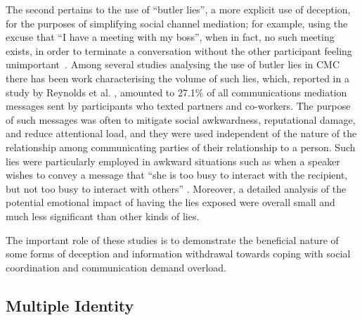 \documentclass{IOS-Book-Article}     %
\newcommand{\tbox}[3][red]{{
\color{#1}\noindent{
   \fbox{\scriptsize{ {\bf #2} \textsl{#3}}}
   \vspace{2pt}
}
}}
\newcommand{\todo}[1]{\tbox{TODO:}{#1}}
\begin{document}
The second pertains to the use of ``butler lies'', a more explicit use of
deception, for the purposes of simplifying social channel mediation; for
example, using the excuse that ``I have a meeting with my boss'', when in fact, no
such meeting exists, in order to terminate a conversation without the other
participant feeling unimportant~\cite{Hancock:2009:BLA:1518701.1518782}.  Among several studies analysing the
use of butler lies in CMC there has been work characterising the volume of such lies,
which, reported in a study by Reynolds et al.
\cite{Reynolds:2013:BLB:2441776.2441862}, amounted to 27.1\% of all
communications mediation messages sent by participants who texted partners and
co-workers. The purpose of such messages was often to mitigate social
awkwardness, reputational damage, and reduce attentional load, and they were used
independent of the nature of the relationship among communicating parties of
their relationship to a person.  Such lies were particularly employed in awkward
situations such as when a speaker wishes to convey a message that ``she is too
busy to interact with the recipient, but not too busy to interact with others''
\cite{Reynolds:2013:BLB:2441776.2441862}.  Moreover, a detailed analysis of the
potential emotional impact of having the lies exposed were overall small and
much less significant than other kinds of lies.                    

The important role of these studies is to demonstrate the beneficial nature of
some forms of deception and information withdrawal towards  coping with social
coordination and communication demand overload.     






\subsection{Multiple Identity}
\end{document}
